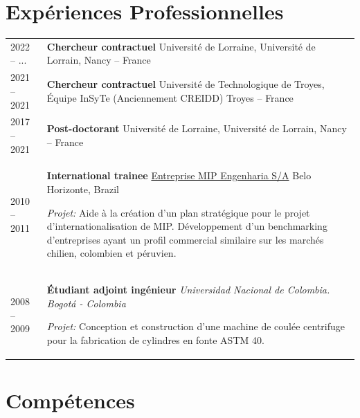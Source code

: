 \documentclass[
  12pt,
  oneside]{book}
\begin{document}
\hypertarget{expuxe9riences-professionnelles}{%
\section{Expériences Professionnelles}\label{expuxe9riences-professionnelles}}

\extrarowsep=3pt
\begin{tabu} to \linewidth {X[0.4,l] X[2,l]}
2022 -- ... &
    \textbf{Chercheur contractuel} Université de Lorraine, Université de Lorrain, Nancy -- France \\[5pt]

2021 -- 2021 &
    \textbf{Chercheur contractuel} Université de Technologique de Troyes, Équipe InSyTe (Anciennement CREIDD) Troyes -- France \\[5pt]

2017 -- 2021 &
    \textbf{Post-doctorant} Université de Lorraine, Université de Lorrain, Nancy -- France \\[5pt]

2010 -- 2011 & \textbf{International trainee} \href{http://www.mipengenharia.com.br/}{Entreprise MIP Engenharia S/A} \thinspace Belo Horizonte, Brazil \par
\textit{Projet:} Aide à la création d'un plan stratégique pour le projet d'internationalisation de MIP. Développement d'un benchmarking d'entreprises ayant un profil commercial similaire sur les marchés chilien, colombien et péruvien. \\
    
2008 -- 2009 &
    \textbf{Étudiant adjoint ingénieur} \emph{Universidad Nacional de Colombia. Bogotá - Colombia}  \par 
    \emph{Projet:} Conception et construction d'une machine de coulée centrifuge pour la fabrication de cylindres en fonte ASTM 40. \\
\end{tabu}

\hypertarget{compuxe9tences}{%
\section{Compétences}\label{compuxe9tences}}
\end{document}
